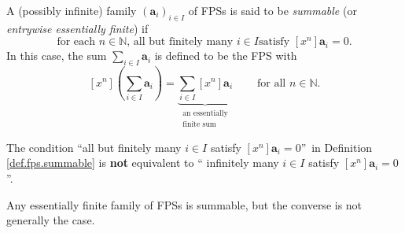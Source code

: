 \begin{definition}
\label{def.fps.summable}A (possibly infinite) family $\left(  \mathbf{a}%
_{i}\right)  _{i\in I}$ of FPSs is said to be \emph{summable} (or
\emph{entrywise essentially finite}) if%
\[
\text{for each }n\in\mathbb{N}\text{, all but finitely many }i\in I\text{
satisfy }\left[  x^{n}\right]  \mathbf{a}_{i}=0.
\]
In this case, the sum $\sum_{i\in I}\mathbf{a}_{i}$ is defined to be the FPS
with%
\begin{equation}
\left[  x^{n}\right]  \left(  \sum_{i\in I}\mathbf{a}_{i}\right)
=\underbrace{\sum_{i\in I}\left[  x^{n}\right]  \mathbf{a}_{i}}%
_{\substack{\text{an essentially}\\\text{finite sum}}%
}\ \ \ \ \ \ \ \ \ \ \text{for all }n\in\mathbb{N}\text{.}
\label{eq.def.fps.summable.sum}%
\end{equation}

\end{definition}

\begin{remark}
The condition \textquotedblleft all but finitely many $i\in I$ satisfy
$\left[  x^{n}\right]  \mathbf{a}_{i}=0$\textquotedblright\ in Definition
\ref{def.fps.summable} is \textbf{not} equivalent to \textquotedblleft
infinitely many $i\in I$ satisfy $\left[  x^{n}\right]  \mathbf{a}_{i}%
=0$\textquotedblright.
\end{remark}

Any essentially finite family of FPSs is summable, but the converse is not
generally the case.

